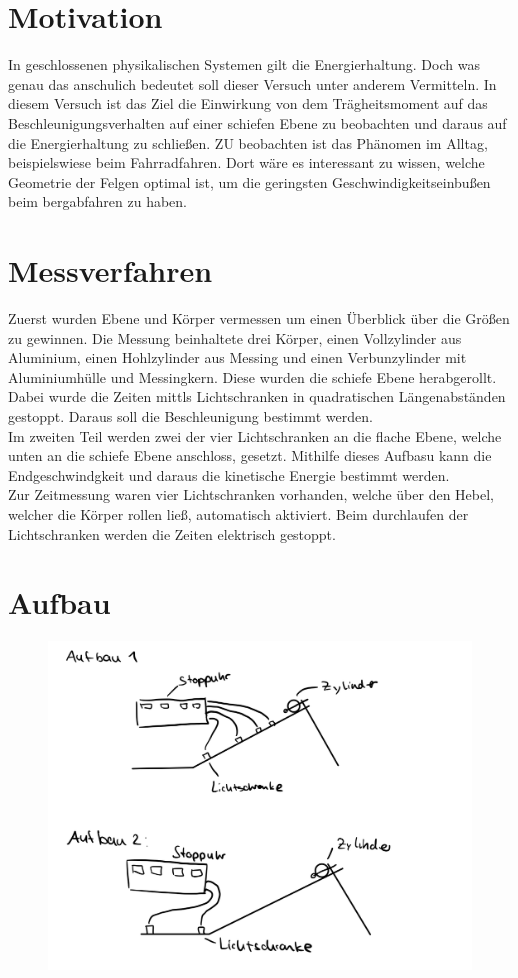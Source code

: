 \section{Motivation}
In geschlossenen physikalischen Systemen gilt die Energierhaltung. Doch was genau das anschulich bedeutet
soll dieser Versuch unter anderem Vermitteln. In diesem Versuch ist das Ziel die Einwirkung von dem Trägheitsmoment
auf das Beschleunigungsverhalten auf einer schiefen Ebene zu beobachten und daraus auf die Energierhaltung zu schließen.
ZU beobachten ist das Phänomen im Alltag, beispielswiese beim Fahrradfahren. Dort wäre es interessant zu wissen, welche Geometrie der Felgen optimal ist,
um die geringsten Geschwindigkeitseinbußen beim bergabfahren zu haben.


\section{Messverfahren}
Zuerst wurden Ebene und Körper vermessen um einen Überblick über die Größen zu gewinnen.
Die Messung beinhaltete drei Körper, einen Vollzylinder aus Aluminium, einen Hohlzylinder aus Messing und einen Verbunzylinder mit Aluminiumhülle und Messingkern.
Diese wurden die schiefe Ebene herabgerollt. Dabei wurde die Zeiten mittls Lichtschranken in quadratischen Längenabständen gestoppt.
Daraus soll die Beschleunigung bestimmt werden. \\
Im zweiten Teil werden zwei der vier Lichtschranken an die flache Ebene, welche unten an die schiefe Ebene anschloss, gesetzt.
Mithilfe dieses Aufbasu kann die Endgeschwindgkeit und daraus die kinetische Energie bestimmt werden.\\
Zur Zeitmessung waren vier Lichtschranken vorhanden, welche über den Hebel, welcher die Körper rollen ließ, automatisch aktiviert.
Beim durchlaufen der Lichtschranken werden die Zeiten elektrisch gestoppt.

\section{Aufbau}

\begin{figure}[h!]
    \centering
    \includegraphics[width = .7\textwidth]{Aufbau15.jpeg}
\end{figure}
\newpage

